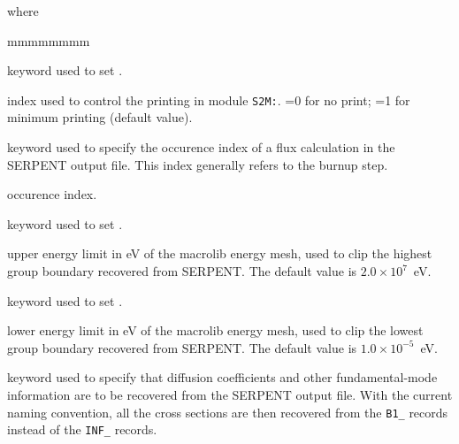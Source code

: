 \noindent where
\begin{ListeDeDescription}{mmmmmmmm}

\item[\moc{EDIT}] keyword used to set .

\item[\dusa{iprint}] index used to control the printing in module {\tt S2M:}. =0 for no print; =1 for minimum printing (default value).

\item[\moc{IDX}] keyword used to specify the occurence index of a flux calculation in the SERPENT output file. This index generally refers to the burnup step.

\item[\dusa{idx}] occurence index.

\item[\moc{EMAX}] keyword used to set .

\item[\dusa{emax}] upper energy limit in eV of the {\sc macrolib} energy mesh, used to clip the highest group
boundary recovered from SERPENT. The default value is $2.0 \times 10^{7}$~eV.

\item[\moc{EMIN}] keyword used to set .

\item[\dusa{emin}] lower energy limit in eV of the {\sc macrolib} energy mesh, used to clip the lowest group
boundary recovered from SERPENT. The default value is $1.0 \times 10^{-5}$~eV.

\item[\moc{B1}] keyword used to specify that diffusion coefficients and other fundamental-mode information are to be
recovered from the SERPENT output file. With the current naming convention, all the cross sections are then
recovered from the {\tt B1\_} records instead of the {\tt INF\_} records.

\end{ListeDeDescription}

\eject
